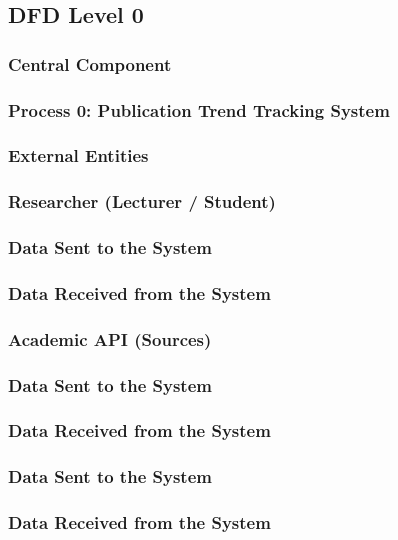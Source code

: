 \subsection{DFD Level 0}

\subsubsection{Central Component}
\subsubsection*{Process 0: Publication Trend Tracking System}

\subsubsection{External Entities}
\subsubsection*{Researcher (Lecturer / Student)}

\subsubsection*{Data Sent to the System}

\subsubsection*{Data Received from the System}

\subsubsection*{Academic API (Sources)}

\subsubsection*{Data Sent to the System}

\subsubsection*{Data Received from the System}

\subsubsection*{Data Sent to the System}

\subsubsection*{Data Received from the System}


